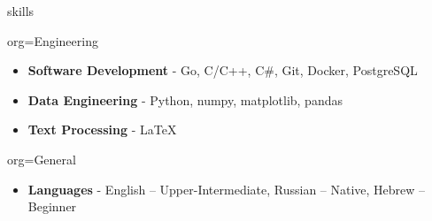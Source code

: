 \documentclass{resume}
\begin{document}
\makeheader

\begin{ResumeSection}{skills}
    \newcommand{\skill}[2]{\textbf{#1} - #2}
    \begin{ResumeSubsection}{org=Engineering}
        \begin{itemize}
            \item \skill{Software Development}{Go, C/C++, C\#, Git, Docker, PostgreSQL}
            \item \skill{Data Engineering}{Python, numpy, matplotlib, pandas}
            \item \skill{Text Processing}{LaTeX}
        \end{itemize}
    \end{ResumeSubsection}

    \begin{ResumeSubsection}{org=General}
        \begin{itemize}
            \item \skill{Languages}{English -- Upper-Intermediate, Russian -- Native, Hebrew -- Beginner}
        \end{itemize}
    \end{ResumeSubsection}
\end{ResumeSection}
\end{document}
